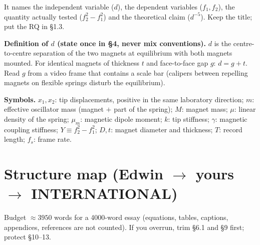 \documentclass[11pt,a4paper]{article}
\newcommand{\Y}{Y}                       %
\newcommand{\mum}{\mu_m}
\begin{document}
It names the independent variable ($d$), the dependent variables ($f_1,f_2$), the quantity
actually tested ($f_2^2-f_1^2$) and the theoretical claim ($d^{-5}$). Keep the title; put the
RQ in \S1.3.

\medskip
\textbf{Definition of $d$ (state once in \S4, never mix conventions).} $d$ is the
centre-to-centre separation of the two magnets at equilibrium with both magnets mounted. For
identical magnets of thickness $t$ and face-to-face gap $g$: $d=g+t$. Read $g$ from a video
frame that contains a scale bar (calipers between repelling magnets on flexible springs
disturb the equilibrium).

\textbf{Symbols.} $x_1,x_2$: tip displacements, positive in the same laboratory direction;
$m$: effective oscillator mass (magnet $+$ part of the spring); $M$: magnet mass; $\mu$:
linear density of the spring; $\mum$: magnetic dipole moment; $k$: tip stiffness; $\gamma$:
magnetic coupling stiffness; $\Y\equiv f_2^2-f_1^2$; $D,t$: magnet diameter and thickness;
$T$: record length; $f_s$: frame rate.

\section{Structure map (Edwin $\rightarrow$ yours $\rightarrow$ INTERNATIONAL)}

Budget $\approx3950$ words for a 4000-word essay (equations, tables, captions, appendices,
references are not counted). If you overrun, trim \S6.1 and \S9 first; protect \S10--13.
\end{document}
